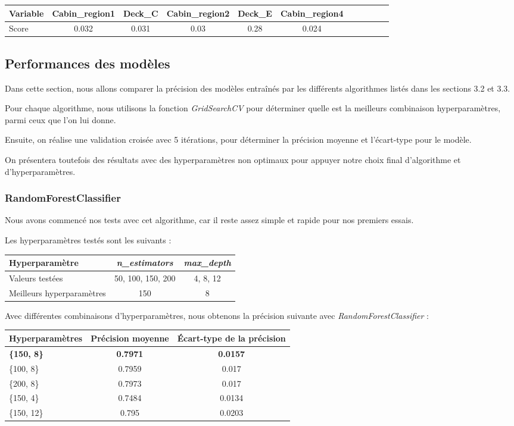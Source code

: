 \documentclass[a4paper]{article}
\begin{document}
    \begin{tabular}{| l | *{10}{c|}}
        \hline
        Variable & Cabin\_region1 & Deck\_C & Cabin\_region2 & Deck\_E & Cabin\_region4
        \tabularnewline
        \hline
        Score & 0.032 & 0.031 & 0.03 & 0.28 & 0.024
        \tabularnewline
        \hline
    \end{tabular}

    \subsection{Performances des modèles}

    Dans cette section, nous allons comparer la précision des modèles entraînés par les différents algorithmes
    listés dans les sections 3.2 et 3.3.

    Pour chaque algorithme, nous utilisons la fonction {\it GridSearchCV} pour déterminer quelle est la meilleurs
    combinaison hyperparamètres, parmi ceux que l'on lui donne.

    Ensuite, on réalise une validation croisée avec 5 itérations, pour déterminer la précision moyenne et l'écart-type
    pour le modèle.

    On présentera toutefois des résultats avec des hyperparamètres non optimaux pour appuyer notre choix
    final d'algorithme et d'hyperparamètres.

    \subsubsection{RandomForestClassifier}

    Nous avons commencé nos tests avec cet algorithme, car il reste assez simple et rapide pour nos premiers essais.

    Les hyperparamètres testés sont les suivants :

    \begin{tabular}{| l | *{2}{c|}}
        \hline
        Hyperparamètre & {\it n\_estimators} & {\it max\_depth}
        \tabularnewline
        \hline
        Valeurs testées & 50, 100, 150, 200 & 4, 8, 12
        \tabularnewline
        \hline
        Meilleurs hyperparamètres & 150 & 8
        \tabularnewline
        \hline
    \end{tabular}

    Avec différentes combinaisons d'hyperparamètres, nous obtenons la précision suivante avec {\it RandomForestClassifier} :

    \begin{tabular}{| l | *{2}{c|}}
        \hline
        Hyperparamètres & Précision moyenne & Écart-type de la précision
        \tabularnewline
        \hline
        \textbf{\{150, 8\}} & \textbf{0.7971} & \textbf{0.0157} 
        \tabularnewline
        \hline
        \{100, 8\} & 0.7959 & 0.017
        \tabularnewline
        \hline
        \{200, 8\} & 0.7973 & 0.017
        \tabularnewline
        \hline
        \{150, 4\} & 0.7484 & 0.0134
        \tabularnewline
        \hline
        \{150, 12\} & 0.795 & 0.0203
        \tabularnewline
        \hline
    \end{tabular}
\end{document}
